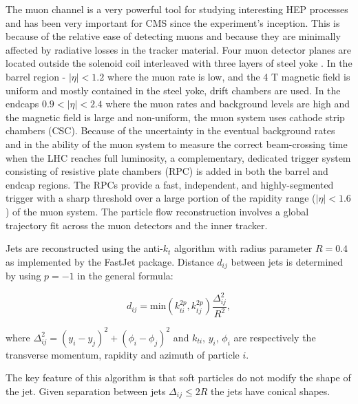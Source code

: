 The muon channel is a very powerful tool for studying interesting HEP processes and has been very important for CMS since the experiment's inception. This is because of the relative ease of detecting muons and because they are minimally affected by radiative losses in the tracker material. Four muon detector planes are located outside the solenoid coil interleaved with three layers of steel yoke \cite{muon_tech_rep}. In the barrel region - $\left|\eta\right|<1.2$ where the muon rate is low, and the 4 T magnetic field is uniform and mostly contained in the steel yoke, drift chambers are used. In the endcaps $0.9<\left|\eta\right|<2.4$ where the muon rates and background levels are high and the magnetic field is large and non-uniform, the muon system uses cathode strip chambers (CSC). Because of the uncertainty in the eventual background rates and in the ability of the muon system to measure the correct beam-crossing time when the LHC reaches full luminosity, a complementary, dedicated trigger system consisting of resistive plate chambers (RPC) is added in both the barrel and endcap regions.  The RPCs provide a fast, independent, and highly-segmented trigger with a sharp \pt threshold over a large portion of the rapidity range ($\left|\eta\right|<1.6$) of the muon system. The particle flow reconstruction involves a global trajectory fit across the muon detectors and the inner tracker. 

Jets are reconstructed using the anti-$k_{t}$ algorithm \cite{Cacciari:2008gp} with radius parameter $R=0.4$ as implemented by the FastJet \cite{Cacciari:2011ma} package. Distance $d_{ij}$ between jets is determined by using $p=-1$ in the general formula:

\begin{equation}
d_{ij}=\text{min}(k_{ti}^{2p}, k_{tj}^{2p})\frac{\Delta_{ij}^{2}}{R^{2}},
\end{equation}

where $\Delta_{ij}^{2} = (y_{i}-y_{j})^{2} + (\phi_{i} - \phi_{j})^{2}$ and $k_{ti}$, $y_{i}$, $\phi_{i}$ are respectively the transverse momentum, rapidity and azimuth of particle $i$. 

The key feature of this algorithm is that soft particles do not modify the shape of the jet. Given separation between jets $\Delta_{ij}\leq2R$ the jets have conical shapes. 

